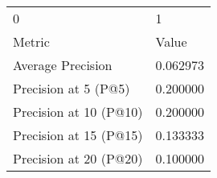 \begin{tabular}{ll}
0 & 1 \\
Metric & Value \\
Average Precision & 0.062973 \\
Precision at 5 (P@5) & 0.200000 \\
Precision at 10 (P@10) & 0.200000 \\
Precision at 15 (P@15) & 0.133333 \\
Precision at 20 (P@20) & 0.100000 \\
\end{tabular}
